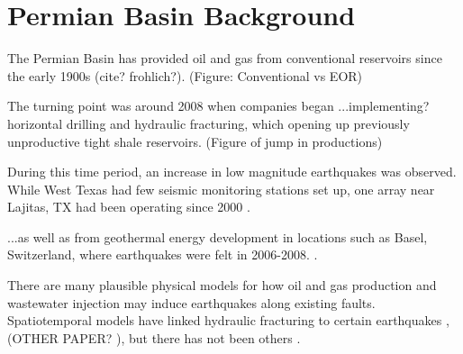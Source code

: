 
\chapter{Permian Basin Background}
\label{CHAP:2}




The Permian Basin has provided oil and gas from conventional reservoirs since the early 1900s (cite? frohlich?).
(Figure: Conventional vs EOR)

The turning point was around 2008 when companies began ...implementing? horizontal drilling and hydraulic fracturing, which opening up previously unproductive tight shale reservoirs.
(Figure of jump in productions)



During this time period, an increase in low magnitude earthquakes was observed. While West Texas had few seismic monitoring stations set up, one array near Lajitas, TX had been operating since 2000 \cite{Frohlich2019OnsetCauseIncreased}.


...as well as from geothermal energy development in locations such as Basel, Switzerland, where earthquakes were felt in 2006-2008. \cite{Deichmann2009EarthquakesInducedStimulation}.


There are many plausible physical models for how oil and gas production and wastewater injection may induce earthquakes along existing faults.
Spatiotemporal models have linked hydraulic fracturing to certain earthquakes \citep{Savvaidis2020InducedSeismicityDelaware}, (OTHER PAPER? ), but there has not been others .


